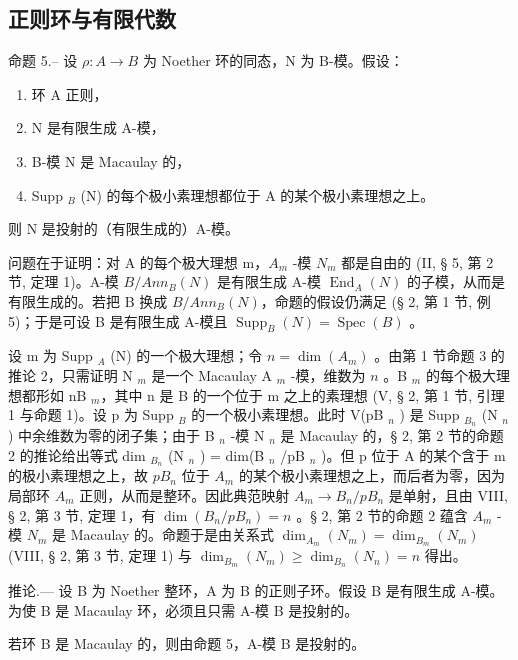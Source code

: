 \subsection{正则环与有限代数}

命题 5.-- 设 \(\rho: A \to B\) 为 Noether 环的同态，N 为 B-模。假设：

\begin{enumerate}
\def\labelenumi{\alph{enumi})}
\item
  环 A 正则，
\item
  N 是有限生成 A-模，
\item
  B-模 N 是 Macaulay 的，
\item
  Supp \(_{B}\) (N) 的每个极小素理想都位于 A 的某个极小素理想之上。
\end{enumerate}

则 N 是投射的（有限生成的）A-模。

问题在于证明：对 A 的每个极大理想 m，\(A_{m}\) -模 \(N_{m}\) 都是自由的 (II, § 5, 第 2 节, 定理 1)。A-模 \(B/Ann_{B}(N)\) 是有限生成 A-模 \(\operatorname{End}_{A}(N)\) 的子模，从而是有限生成的。若把 B 换成 \(B/Ann_{B}(N)\)，命题的假设仍满足 (§ 2, 第 1 节, 例 5)；于是可设 B 是有限生成 A-模且 \(\operatorname{Supp}_{B}(N) = \operatorname{Spec}(B)\) 。

设 m 为 Supp \(_A\) (N) 的一个极大理想；令 \(n = \dim(A_m)\) 。由第 1 节命题 3 的推论 2，只需证明 N \(_m\) 是一个 Macaulay A \(_m\) -模，维数为 \(n\) 。B \(_m\) 的每个极大理想都形如 nB \(_m\)，其中 n 是 B 的一个位于 m 之上的素理想 (V, § 2, 第 1 节, 引理 1 与命题 1)。设 p 为 Supp \(_B\) 的一个极小素理想。此时 V(pB \(_n\) ) 是 Supp \(_{B_n}\) (N \(_n\) ) 中余维数为零的闭子集；由于 B \(_n\) -模 N \(_n\) 是 Macaulay 的，§ 2, 第 2 节的命题 2 的推论给出等式 dim \(_{B_n}\) (N \(_n\) ) = dim(B \(_n\) /pB \(_n\) )。但 p 位于 A 的某个含于 m 的极小素理想之上，故 \(pB_{n}\) 位于 \(A_{m}\) 的某个极小素理想之上，而后者为零，因为局部环 \(A_{m}\) 正则，从而是整环。因此典范映射 \(A_{m} \to B_{n}/pB_{n}\) 是单射，且由 VIII, § 2, 第 3 节, 定理 1，有 \(\dim(B_{n}/pB_{n}) = n\) 。§ 2, 第 2 节的命题 2 蕴含 \(A_{m}\) -模 \(N_{m}\) 是 Macaulay 的。命题于是由关系式 \(\dim_{A_{m}}(N_{m}) = \dim_{B_{m}}(N_{m})\) (VIII, § 2, 第 3 节, 定理 1) 与 \(\dim_{B_{m}}(N_{m}) \geqslant \dim_{B_{n}}(N_{n}) = n\) 得出。

推论.--- 设 B 为 Noether 整环，A 为 B 的正则子环。假设 B 是有限生成 A-模。为使 B 是 Macaulay 环，必须且只需 A-模 B 是投射的。

若环 B 是 Macaulay 的，则由命题 5，A-模 B 是投射的。

